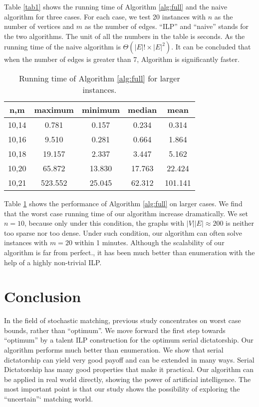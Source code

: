 \documentclass[letterpaper]{article}
\begin{document}
Table \ref{tab1} shows the running time of Algorithm \ref{alg:full} and the naive algorithm for three cases.
For each case, we test 20 instances with $n$ as the number of vertices and $m$ as the number of edges.
``ILP'' and ``naive'' stands for the two algorithms.
The unit of all the numbers in the table is seconds.
As the running time of the naive algorithm is $\Theta(|E|!\times |E|^2)$.
It can be concluded that when the number of edges is greater than 7, Algorithm is significantly faster.

\begin{table}
	\caption{Running time of Algorithm \ref{alg:full} for larger instances.}
	\label{tab2}
	\begin{tabular}{ccccc}
		\hline
		n,m & maximum & minimum & median & mean\\ \hline
		10,14 & 0.781&0.157&0.234&0.314\\
		10,16 & 9.510&0.281&0.664&1.864\\
		10,18 & 19.157&2.337&3.447&5.162\\
		10,20 & 65.872&13.830&17.763&22.424\\
		10,21 & 523.552&25.045&62.312&101.141\\ \hline
	\end{tabular}
\end{table}

Table \ref{tab2} shows the performance of Algorithm \ref{alg:full} on larger cases.
We find that the worst case running time of our algorithm increase dramatically.
We set $n=10$, because only under this condition, the graphs with $|V||E|\approx200$ is neither too sparse nor too dense.
Under such condition, our algorithm can often solve instances with $m=20$ within 1 minutes.
Although the scalability of our algorithm is far from perfect., it has been much better than enumeration with the help of a highly non-trivial ILP.

\section{Conclusion}
In the field of stochastic matching, previous study concentrates on worst case bounds, rather than ``optimum''.
We move forward the first step towards ``optimum'' by a talent ILP construction for the optimum serial dictatorship.
Our algorithm performs much better than enumeration.
We show that serial dictatorship can yield very good payoff and can be extended in many ways.
Serial Dictatorship has many good properties that make it practical.
Our algorithm can be applied in real world directly, showing the power of artificial intelligence.
The most important point is that our study shows the possibility of exploring the ``uncertain''` matching world.


\newpage


\end{document}
